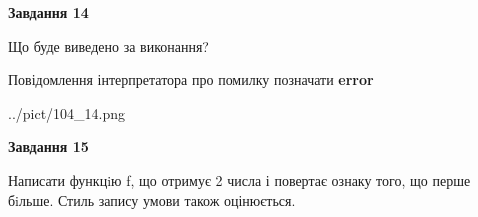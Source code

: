 \documentclass[11pt, ukrainian]{article}
\begin{document}
{\begin {large}
{\begin {center}\textbf{Завдання 14}\end {center}}\par
Що буде виведено за виконання? \par
Повідомлення інтерпретатора про помилку позначати \textbf{error}

\begin{center}
	{../pict/104_14.png}
\end{center}
\newpage

{\begin {center}\textbf{Завдання 15}\end {center}}\par

Написати функцiю f, що отримує 2 числа і повертає ознаку того, що перше бiльше. Стиль запису умови також оцінюється.\par
\newpage

\end {large}}
\end{document}
